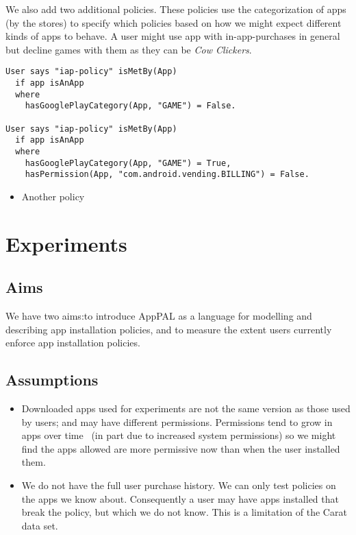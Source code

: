 \documentclass[twocolumn,letterpaper]{soups-poster}
\newcommand{\citep}[1]{\cite{#1}}
\begin{document}
We also add two additional policies.
These policies use the categorization of apps (by the stores) to specify which
policies based on how we might expect different kinds of apps to behave.
A user might use app with in-app-purchases in general but decline
games with them as they can be \emph{Cow Clickers}.
\begin{lstlisting}
User says "iap-policy" isMetBy(App)
  if app isAnApp
  where
    hasGooglePlayCategory(App, "GAME") = False.

User says "iap-policy" isMetBy(App)
  if app isAnApp
  where
    hasGooglePlayCategory(App, "GAME") = True,
    hasPermission(App, "com.android.vending.BILLING") = False.
\end{lstlisting}

\begin{itemize}
    \item Another policy
\end{itemize}

\section{Experiments}

\subsection{Aims}

We have two aims:to introduce AppPAL as a language for modelling and describing
app installation policies, and to measure the extent users currently enforce app
installation policies.

\subsection{Assumptions}

\begin{itemize}
  \item Downloaded apps used for experiments are not the same version as those
    used by users; and may have different permissions. Permissions tend to grow
    in apps over time~\citep{Wei:2012id} (in part due to increased system
    permissions) so we might find the apps allowed are more permissive now than
    when the user installed them.

  \item We do not have the full user purchase history.
    We can only test policies on the apps we know about.
    Consequently a user may have apps installed that break the policy, but which
    we do not know.  This is a limitation of the Carat data set.
\end{itemize}
\end{document}
